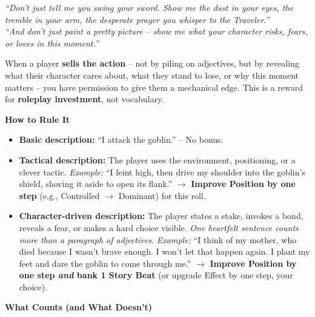 \begin{tcolorbox}[
  colback=red!5!white,
  colframe=red!75!black,
  title=\textbf{Selling the Action -- When Players Give You Gold},
  fonttitle=\bfseries\large,
  sharp corners,
  drop shadow,
  before skip=10pt,
  after skip=10pt,
  breakable
]
\textit{``Don't just tell me you swing your sword. Show me the dust in your eyes, the tremble in your arm, the desperate prayer you whisper to the Traveler.''}\\
\textit{``And don't just paint a pretty picture -- show me what your character risks, fears, or loves in this moment.''}

\medskip
When a player \textbf{sells the action} -- not by piling on adjectives, but by revealing what their character cares about, what they stand to lose, or why this moment matters -- you have permission to give them a mechanical edge. This is a reward for \textbf{roleplay investment}, not vocabulary.

\medskip
\noindent\textbf{How to Rule It}
\begin{itemize}
  \item \textbf{Basic description:} ``I attack the goblin.'' -- No bonus.

  \item \textbf{Tactical description:} The player uses the environment, positioning,
        or a clever tactic.  
        \textit{Example:} ``I feint high, then drive my shoulder into the goblin's
        shield, shoving it aside to open its flank.''  
        $\rightarrow$ \textbf{Improve Position by one step} (e.g., Controlled $\rightarrow$ Dominant)
        for this roll.

  \item \textbf{Character-driven description:} The player states a stake, invokes
        a bond, reveals a fear, or makes a hard choice visible. \textit{One
        heartfelt sentence counts more than a paragraph of adjectives.}  
        \textit{Example:} ``I think of my mother, who died because I wasn't brave
        enough. I won't let that happen again. I plant my feet and dare the
        goblin to come through me.''  
        $\rightarrow$ \textbf{Improve Position by one step \textit{and} bank 1 Story Beat}
        (or upgrade Effect by one step, your choice).
\end{itemize}

\medskip
\noindent\textbf{What Counts (and What Doesn't)}


\end{tcolorbox}

